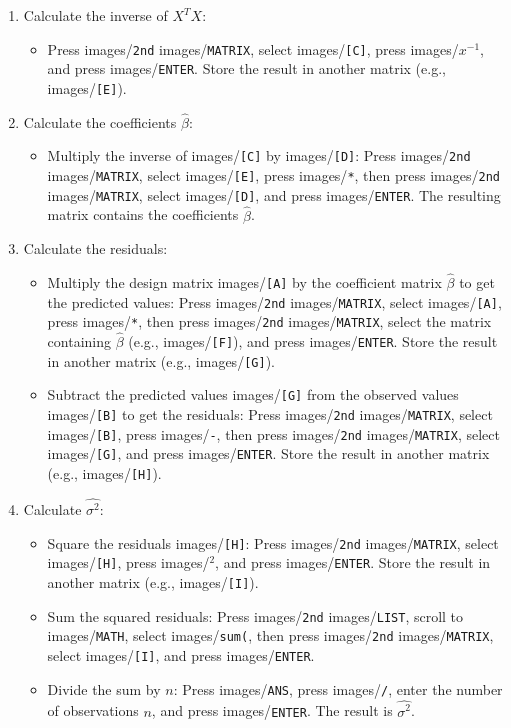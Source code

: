 \documentclass{article}
\newcommand{\code}[1]{images/\colorbox{light-gray}{\texttt{#1}}}
\begin{document}
\begin{enumerate}
\begin{itemize}
    \end{itemize}
    \item Calculate the inverse of $X^T X$:
    \begin{itemize}
        \item Press \code{2nd} \code{MATRIX}, select \code{[C]}, press \code{$x^{-1}$}, and press \code{ENTER}. Store the result in another matrix (e.g., \code{[E]}).
    \end{itemize}
    \item Calculate the coefficients $\hat{\beta}$:
    \begin{itemize}
        \item Multiply the inverse of \code{[C]} by \code{[D]}: Press \code{2nd} \code{MATRIX}, select \code{[E]}, press \code{*}, then press \code{2nd} \code{MATRIX}, select \code{[D]}, and press \code{ENTER}. The resulting matrix contains the coefficients $\hat{\beta}$.
    \end{itemize}
    \item Calculate the residuals:
    \begin{itemize}
        \item Multiply the design matrix \code{[A]} by the coefficient matrix $\hat{\beta}$ to get the predicted values: Press \code{2nd} \code{MATRIX}, select \code{[A]}, press \code{*}, then press \code{2nd} \code{MATRIX}, select the matrix containing $\hat{\beta}$ (e.g., \code{[F]}), and press \code{ENTER}. Store the result in another matrix (e.g., \code{[G]}).
        \item Subtract the predicted values \code{[G]} from the observed values \code{[B]} to get the residuals: Press \code{2nd} \code{MATRIX}, select \code{[B]}, press \code{-}, then press \code{2nd} \code{MATRIX}, select \code{[G]}, and press \code{ENTER}. Store the result in another matrix (e.g., \code{[H]}).
    \end{itemize}
    \item Calculate $\hat{\sigma^2}$:
    \begin{itemize}
        \item Square the residuals \code{[H]}: Press \code{2nd} \code{MATRIX}, select \code{[H]}, press \code{$^2$}, and press \code{ENTER}. Store the result in another matrix (e.g., \code{[I]}).
        \item Sum the squared residuals: Press \code{2nd} \code{LIST}, scroll to \code{MATH}, select \code{sum(}, then press \code{2nd} \code{MATRIX}, select \code{[I]}, and press \code{ENTER}.
        \item Divide the sum by $n$: Press \code{ANS}, press \code{/}, enter the number of observations $n$, and press \code{ENTER}. The result is $\hat{\sigma^2}$.
    \end{itemize}
\end{enumerate}
\end{document}
